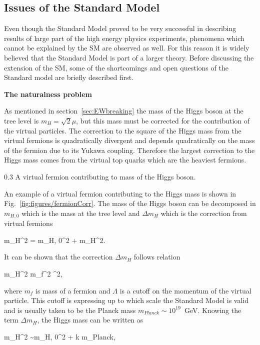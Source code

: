 \subsection{Issues of the Standard Model}

Even though the Standard Model proved to be very successful in describing results of large part of the high energy physics experiments, phenomena which cannot be explained by the SM are observed as well. For this reason it is widely believed that the Standard Model is part of a larger theory. Before discussing the extension of the SM, some of the shortcomings and open questions of the Standard model are briefly described first.


\textbf{The naturalness problem}

As mentioned in section~\ref{sec:EWbreaking} the mass of the Higgs boson at the tree level is $m_{H} = \sqrt{2}\mu$, but this mass must be corrected for the contribution of the virtual particles. The correction to the square of the Higgs mass from the virtual fermions is quadratically divergent and depends quadratically on the mass of the fermion due to its Yukawa coupling. Therefore the largest correction to the Higgs mass comes from the virtual top quarks which are the heaviest fermions.

                 {0.3}       %
                 { A virtual fermion contributing to mass of the Higgs boson. }

An example of a virtual fermion contributing to the Higgs mass is shown in Fig.~\ref{fig:figures/fermionCorr}. The mass of the Higgs boson can be decomposed in $m_{H,0}$ which is the mass at the tree level and $\Delta m_{H}$ which is the correction from virtual fermions

{
m_{H}^{2} = m_{H, 0}^{2} + \Delta m_{H}^{2}.
}

It can be shown that the correction $\Delta m_{H}$ follows relation

{
\Delta m_{H}^{2} \propto m_{f}^{2} \Lambda^2,
}

where $m_f$ is mass of a fermion and $\Lambda$ is a cutoff on the momentum of the virtual particle. This cutoff is expressing up to which scale the Standard Model is valid and is usually taken to be the Planck mass $m_{Planck} \sim  10^{19}$~GeV. Knowing the term $\Delta m_{H}$, the Higgs mass can be written as

{
m_{H}^{2} \sim m_{H, 0}^{2} + k  m_{Planck},
}

